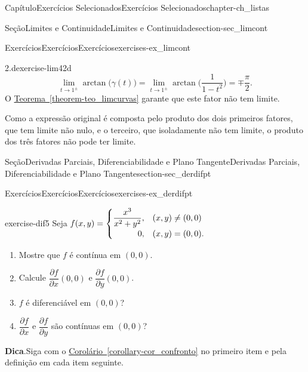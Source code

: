 \documentclass[oneside,10pt,]{book}
\newcommand{\blocktitlefont}{\relax}
\newcommand{\xreffont}{\relax}
\numberwithin{equation}{section}
\begin{document}
\begin{chapterptx}{Capítulo}{Exercícios Selecionados}{}{Exercícios Selecionados}{}{}{chapter-ch_listas}
\begin{sectionptx}{Seção}{Limites e Continuidade}{}{Limites e Continuidade}{}{}{section-sec_limcont}
\begin{exercises-subsection-numberless}{Exercícios}{Exercícios}{}{Exercícios}{}{}{exercises-ex_limcont}
\begin{divisionexercise}{2.d}{}{}{exercise-lim42d}
\begin{equation*}
\lim\limits_{t\to
1^\pm}\arctan\big(\gamma(t)\big)=\lim\limits_{t\to
1^\pm}\arctan\big(\dfrac{1}{1-t^2}\big)=\mp\frac{\pi}{2}.
\end{equation*}
O \hyperref[theorem-teo_limcurvas]{Teorema~{\xreffont\ref{theorem-teo_limcurvas}}} garante que este fator não tem limite.%
\par
Como a expressão original é composta pelo produto dos dois primeiros fatores, que tem limite não nulo, e o terceiro, que isoladamente não tem limite, o produto dos três fatores não pode ter limite.%
\end{divisionexercise}%
\end{exercises-subsection-numberless}
\end{sectionptx}
%
%
\typeout{************************************************}
\typeout{************************************************}
%
\begin{sectionptx}{Seção}{Derivadas Parciais, Diferenciabilidade e Plano Tangente}{}{Derivadas Parciais, Diferenciabilidade e Plano Tangente}{}{}{section-sec_derdifpt}
%
%
\typeout{************************************************}
\typeout{************************************************}
%
\begin{exercises-subsection-numberless}{Exercícios}{Exercícios}{}{Exercícios}{}{}{exercises-ex_derdifpt}
\begin{divisionexercise}{5}{}{}{exercise-dif5}%
Seja \(f(x,y)=\begin{cases}
\dfrac{x^3}{x^2+y^2},&(x,y)\neq(0,0)\\
\hfill 0,&(x,y)=(0,0).
\end{cases}\)%
\begin{enumerate}[label=\alph*]
\item{}Mostre que \(f\) é contínua em \((0,0)\).%
\item{}Calcule \(\dfrac{\partial f}{\partial x}(0,0)\) e \(\dfrac{\partial f}{\partial y}(0,0)\).%
\item{}\(f\) é diferenciável em \((0,0)\)?%
\item{}\(\dfrac{\partial f}{\partial x}\) e \(\dfrac{\partial f}{\partial y}\) são contínuas em \((0,0)\)?%
\end{enumerate}
%
\par\smallskip%
\noindent\textbf{\blocktitlefont Dica}.\hypertarget{hint-dif5-b}{}\quad{}Siga com o \hyperref[corollary-cor_confronto]{Corolário~{\xreffont\ref{corollary-cor_confronto}}} no primeiro item e pela definição em cada item seguinte.%

\end{divisionexercise}
\end{exercises-subsection-numberless}
\end{sectionptx}
\end{chapterptx}
\end{document}
